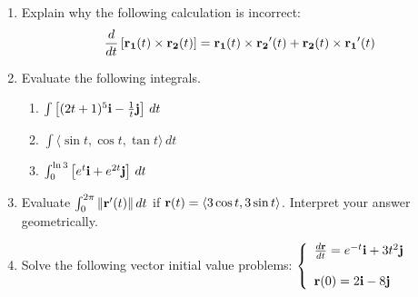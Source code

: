 \documentclass[12pt]{article}
\newif\ifans
\begin{document}
\begin{enumerate}
\item Explain why the following calculation is incorrect:
$$\frac{d}{dt}\left[{\bf r_1}(t)\times{\bf r_2}(t)\right]={\bf r_1}(t)\times {\bf r_2}^{\prime}(t)+{\bf r_2}(t)\times{\bf r_1}^{\prime}(t)$$

\ifans{\fbox{\parbox{1\linewidth}{The order of the terms matters when dealing with cross products.  The correct derivative statement is:
$$\frac{d}{dt}\left[{\bf r_1}(t)\times{\bf r_2}(t)\right]={\bf r_1}(t)\times {\bf r_2}^{\prime}(t)+{\bf r_1}^{\prime}(t)\times{\bf r_2}(t)$$}}} \fi

\item Evaluate the following integrals.

\begin{enumerate}

\item $\int \left[(2t+1)^5{\bf i}-\frac{1}{t}{\bf j}\right]\,dt$

\ifans{\fbox{$\left(\frac{1}{12}(2t+1)^6+c_1\right){\bf i}-(\ln{|t|}+c_2){\bf j}$; i.e., $\left\langle\frac{1}{12}(2t+1)^6,-\ln{|t|}\right\rangle+\overrightarrow{c}$}} \fi

\item $\int \langle \sin{t},\cos{t},\tan{t} \rangle \,dt$

\ifans{\fbox{\parbox{1\linewidth}{$(-\cos{t}+c_1){\bf i}+(\sin{t}+c_2){\bf j}+(\ln{|\sec{t}|}+c_3){\bf k}$; or, equivalently,
$\left\langle -\cos{t}, \sin{t}, \ln{|\sec{t}|}\right\rangle+\overrightarrow{c}$}}} \fi

\item $\int_0^{\ln3} \left[e^t{\bf i}+e^{2t}{\bf j}\right] \,dt$

\ifans{\fbox{$\langle 2,4 \rangle$}} \fi

\end{enumerate}

\item  Evaluate $\int_0^{2\pi} \|{\bf r}^{\prime}(t)\| \,dt$ if ${\bf r}(t)=\langle 3\cos{t}, 3\sin{t} \rangle$.  Interpret your answer geometrically.

\ifans{\fbox{\parbox{1\linewidth}{$6\pi$.  The given curve represents a circle centered at the origin with a radius of 3; this integral gives the arc length (circumference) of the circle.}}} \fi

\item Solve the following vector initial value problems: $\left\{\begin{array}{l}
\frac{d{\bf r}}{dt}=e^{-t}{\bf i}+3t^2{\bf j}\\
\\
{\bf r}(0)=2{\bf i}-8{\bf j}\end{array}\right.$


\end{enumerate}
\end{document}
